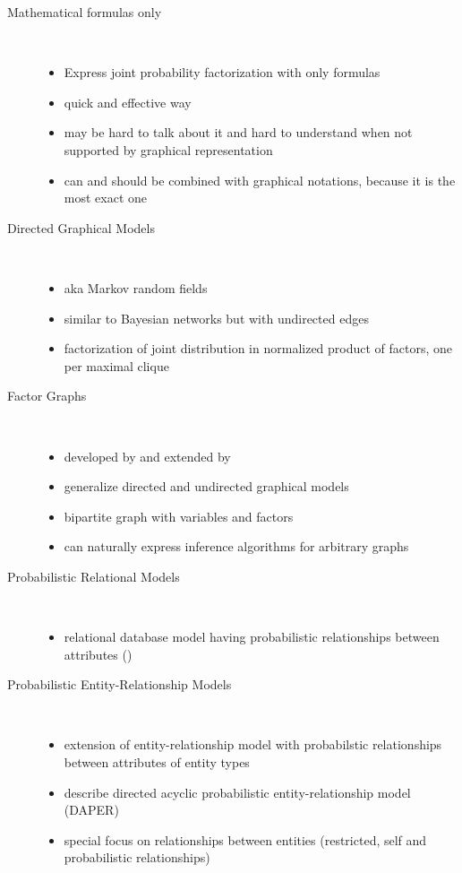 \begin{description}
\item[Mathematical formulas only]\ 
\begin{itemize}
\item Express joint probability factorization with only formulas
\item quick and effective way
\item may be hard to talk about it and hard to understand when not supported by graphical representation
\item can and should be combined with graphical notations, because it is the most exact one
\end{itemize}

\item[Directed Graphical Models]\ 
\begin{itemize}
\item aka Markov random fields
\item similar to Bayesian networks but with undirected edges
\item factorization of joint distribution in normalized product of factors, one per maximal clique
\end{itemize}

\item[Factor Graphs]\ 
\begin{itemize}
\item developed by \textcite{kschischang2001factor} and extended by \textcite{frey2002extending}
\item generalize directed and undirected graphical models
\item bipartite graph with variables and factors
\item can naturally express inference algorithms for arbitrary graphs
\end{itemize}

\item[Probabilistic Relational Models]\ 
\begin{itemize}
\item relational database model having probabilistic relationships between attributes (\cite{friedman1999learning})
\end{itemize}

\item[Probabilistic Entity-Relationship Models]\ 
\begin{itemize}
\item extension of entity-relationship model with probabilstic relationships between attributes of entity types
\item \cite{heckerman2007probabilistic} describe directed acyclic probabilistic entity-relationship model (DAPER)
\item special focus on relationships between entities (restricted, self and probabilistic relationships)
\end{itemize}
\end{description}

